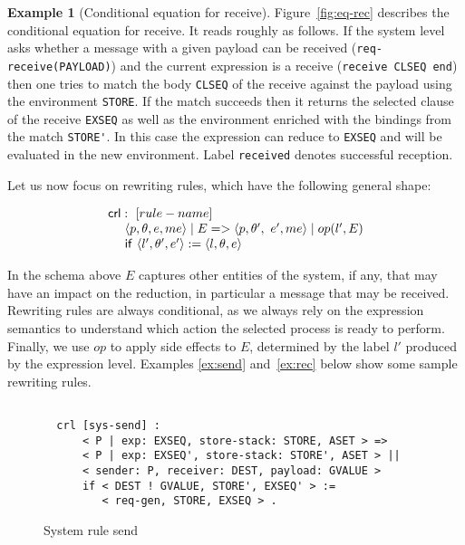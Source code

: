 \documentclass{article}[12pt,a4paper]
\theoremstyle{definition}
\newtheorem{example}{Example}[section]
\newcommand{\paral}{\;|\;}
\begin{document}
\begin{example}[Conditional equation for receive]\label{ex:eqrec}
Figure~\ref{fig:eq-rec} describes the conditional equation for
receive. It reads roughly as follows. If the system level asks whether
a message with a given payload can be received
(\verb+req-receive(PAYLOAD)+) and the current expression is a receive
(\verb+receive CLSEQ end+) then one tries to match the body
\verb+CLSEQ+ of the receive against the payload using the environment \verb|STORE|. If the match succeeds then it returns the selected clause of the receive \verb+EXSEQ+ as well as the environment enriched with the bindings from the match
 \verb+STORE'+. In this case the expression can reduce to \verb+EXSEQ+ and will be evaluated in the new environment. Label \verb+received+ denotes successful reception.
\end{example}

Let us now focus on rewriting rules, which have the following general shape:

\[
  \begin{array}{l}

    \ms{crl}:~[rule-name]\\
    ~~~~\langle p, \theta, e, me \rangle \paral E => \langle p,\theta',~e', me \rangle \paral op(l', E)\\
    ~~~~\ms{if}~\langle l', \theta', e'\rangle := \langle l,\theta,e\rangle


  \end{array}
\]

In the schema above $E$ captures other entities of the system, if any,
that may have an impact on the reduction, in particular a message that
may be received.  Rewriting rules are always conditional, as we always
rely on the expression semantics to understand which action the
selected process is ready to perform. Finally, we use $op$ to apply
side effects to $E$, determined by the label $l'$ produced by the
expression level. Examples \ref{ex:send} and~\ref{ex:rec} below show
some sample rewriting rules.

\begin{figure}[t]
  \centering
\begin{verbatim}

  crl [sys-send] :
      < P | exp: EXSEQ, store-stack: STORE, ASET > =>
      < P | exp: EXSEQ', store-stack: STORE', ASET > ||
      < sender: P, receiver: DEST, payload: GVALUE >
      if < DEST ! GVALUE, STORE', EXSEQ' > :=
         < req-gen, STORE, EXSEQ > .
\end{verbatim}
  \caption{System rule send}
  \label{fig:rule-send}
\end{figure}
\end{document}
